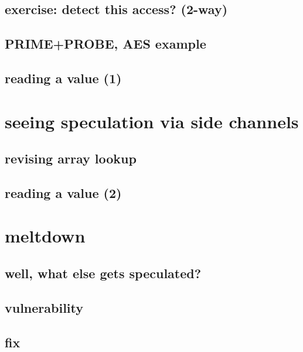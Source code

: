 \subsection{exercise: detect this access? (2-way)}


\subsection{PRIME+PROBE, AES example}

\subsection{reading a value (1)}


\section{seeing speculation via side channels}

\subsection{revising array lookup}

 

\subsection{reading a value (2)}


\section{meltdown}

\subsection{well, what else gets speculated?}


\subsection{vulnerability}


\subsection{fix}


